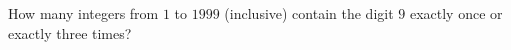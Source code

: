How many integers from $1$ to $1999$ (inclusive) contain the digit $9$ exactly once or exactly three times?
